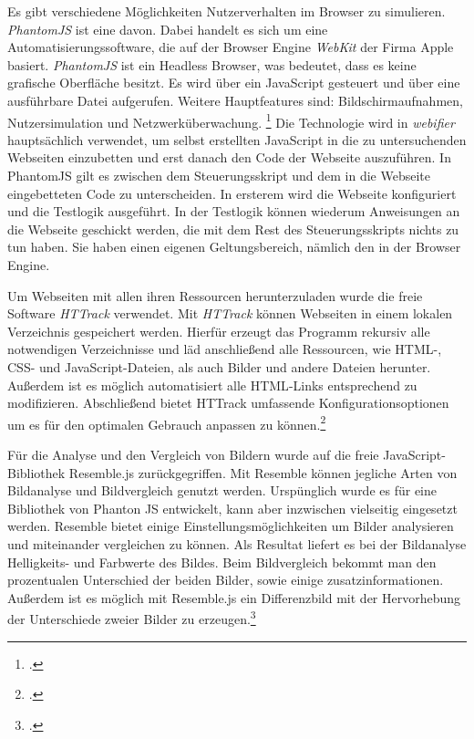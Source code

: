 Es gibt verschiedene Möglichkeiten Nutzerverhalten im Browser zu simulieren.
\textit{PhantomJS} ist eine davon.
Dabei handelt es sich um eine Automatisierungssoftware, die auf der Browser Engine \textit{WebKit} der Firma Apple basiert.
\textit{PhantomJS} ist ein Headless Browser, was bedeutet, dass es keine grafische Oberfläche besitzt.
Es wird über ein JavaScript gesteuert und über eine ausführbare Datei aufgerufen.
Weitere Hauptfeatures sind: Bildschirmaufnahmen, Nutzersimulation und Netzwerküberwachung.
\footcite[Vgl.][]{phantomjs}
Die Technologie wird in \textit{webifier} hauptsächlich verwendet, um selbst erstellten JavaScript in die zu untersuchenden Webseiten einzubetten und erst danach den Code der Webseite auszuführen.
In PhantomJS gilt es zwischen dem Steuerungsskript und dem in die Webseite eingebetteten Code zu unterscheiden.
In ersterem wird die Webseite konfiguriert und die Testlogik ausgeführt.
In der Testlogik können wiederum Anweisungen an die Webseite geschickt werden, die mit dem Rest des Steuerungsskripts nichts zu tun haben. Sie haben einen eigenen Geltungsbereich, nämlich den in der Browser Engine.

Um Webseiten mit allen ihren Ressourcen herunterzuladen wurde die freie Software \textit{HTTrack} verwendet. Mit \textit{HTTrack} können Webseiten in einem lokalen Verzeichnis gespeichert werden. Hierfür erzeugt das Programm rekursiv alle notwendigen Verzeichnisse und läd anschließend alle Ressourcen, wie \ac{HTML}-, \ac{CSS}- und JavaScript-Dateien, als auch Bilder und andere Dateien herunter. Außerdem ist es möglich automatisiert alle \ac{HTML}-Links entsprechend zu modifizieren. Abschließend bietet HTTrack umfassende Konfigurationsoptionen um es für den optimalen Gebrauch anpassen zu können.\footcite[Vgl.][]{httrack}

Für die Analyse und den Vergleich von Bildern wurde auf die freie JavaScript-Bibliothek Resemble.js zurückgegriffen. Mit Resemble können jegliche Arten von Bildanalyse und Bildvergleich genutzt werden. Urspünglich wurde es für eine Bibliothek von Phanton JS entwickelt, kann aber inzwischen vielseitig eingesetzt werden. Resemble bietet einige Einstellungsmöglichkeiten um Bilder analysieren und miteinander vergleichen zu können. Als Resultat liefert es bei der Bildanalyse Helligkeits- und Farbwerte des Bildes. Beim Bildvergleich bekommt man den prozentualen Unterschied der beiden Bilder, sowie einige zusatzinformationen. Außerdem ist es möglich mit Resemble.js ein Differenzbild mit der Hervorhebung der Unterschiede zweier Bilder zu erzeugen.\footcite[Vgl.][]{resemblejs}

